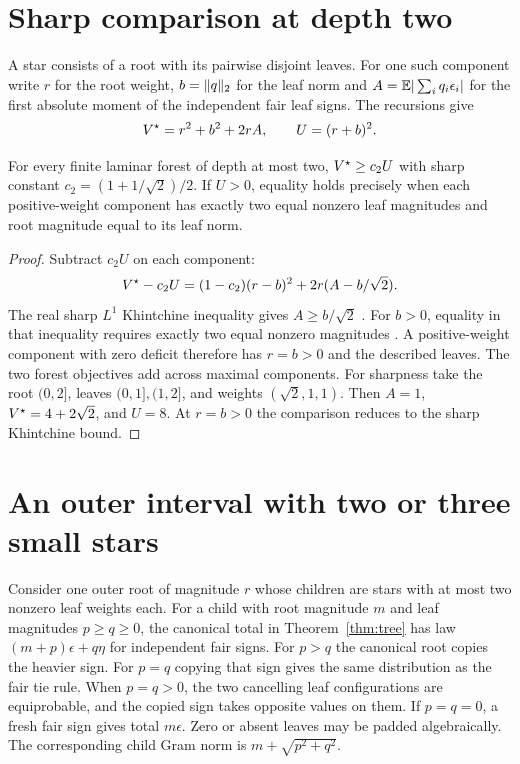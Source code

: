 \section{Sharp comparison at depth two}

A star consists of a root with its pairwise disjoint leaves. For one
such component write $r$ for the root weight, $b=\lVert q\rVert_2$ for the leaf
norm and $A=\mathbb E|\sum_i q_i\epsilon_i|$ for the first absolute moment of
the independent fair leaf signs. The recursions give
\[
 V^\star=r^2+b^2+2rA,\qquad U=(r+b)^2.
\]

\begin{theorem}\label{thm:depth2}
For every finite laminar forest of depth at most two,
$V^\star\ge c_2U$ with sharp constant $c_2=(1+1/\sqrt2)/2$.
If $U>0$, equality holds precisely when each positive-weight
component has exactly two equal nonzero leaf magnitudes and root
magnitude equal to its leaf norm.
\end{theorem}
\begin{proof}
Subtract $c_2U$ on each component:
\[
 V^\star-c_2U=(1-c_2)(r-b)^2+2r(A-b/\sqrt2).
\]
The real sharp $L^1$ Khintchine inequality gives $A\ge b/\sqrt2$
\cite{szarek,haagerup}. For $b>0$, equality in that inequality requires
exactly two equal nonzero magnitudes \cite{de}. A positive-weight
component with zero deficit therefore has $r=b>0$ and the described
leaves. The two forest objectives add across maximal components.
For sharpness take the root $(0,2]$, leaves $(0,1],(1,2]$, and
weights $(\sqrt2,1,1)$. Then $A=1$, $V^\star=4+2\sqrt2$, and $U=8$.
At $r=b>0$ the comparison reduces to the sharp Khintchine bound.
\end{proof}

\section{An outer interval with two or three small stars}

Consider one outer root of magnitude $r$ whose children are stars
with at most two nonzero leaf weights each. For a child with root
magnitude $m$ and leaf magnitudes $p\ge q\ge0$, the canonical total in
Theorem~\ref{thm:tree} has law $(m+p)\epsilon+q\eta$ for independent fair
signs. For $p>q$ the canonical root copies the heavier sign. For $p=q$
copying that sign gives the same distribution as the fair tie rule.
When $p=q>0$, the two cancelling leaf configurations are equiprobable,
and the copied sign takes opposite values on them. If $p=q=0$,
a fresh fair sign gives total $m\epsilon$. Zero or absent leaves may
be padded algebraically. The corresponding child Gram norm is
$m+\sqrt{p^2+q^2}$.


